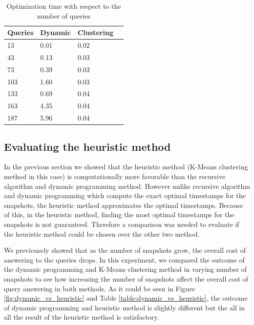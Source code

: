 			\begin {center}
			\begin{table}
				\centering
				\caption{Optimization time with respect to the number of queries}
				\label {table:variable_queries_2}
				\begin{tabular}{p{2cm}p{3cm}p{3cm}p{3cm}}
					\hline
					Queries  & Dynamic  & Clustering \\ \hline
					13 & 0.01  & 0.02  \\  
					43 & 0.13  & 0.03  \\
					73 & 0.39  & 0.03  \\
					103 & 1.60  & 0.03  \\
					133 & 0.69  & 0.04 \\
					163 & 4.35  & 0.04  \\
					187 & 5.96  & 0.04  \\\hline
				\end{tabular}
			\end{table}
			\end{center}

			\subsection{Evaluating the heuristic method} \label{sec:evaluating_heuristic}
			In the previous section we showed that the heuristic method (K-Means clustering method in this case) is computationally more favorable than the recursive algorithm and dynamic programming method. However unlike recursive algorithm and dynamic programming which compute the exact optimal timestamps for the snapshots, the heuristic method approximates the optimal timestamps. Because of this, in the heuristic method, finding the most optimal timestamps for the snapshots is not guaranteed. Therefore a comparison was needed to evaluate if the heuristic method could be chosen over the other two method.

			We previousely showed that as the number of snapshots grow, the overall cost of answering to the queries drops. In this experiment, we compared the outcome of the dynamic programming and K-Means clustering method in varying number of snapshots to see how increasing the number of snapshots affect the overall cost of query answering in both methods. As it could be seen in Figure \ref{fig:dynamic_vs_heuristic} and Table \ref{table:dynamic_vs_heuristic}, the outcome of dynamic programming and heuristic method is slightly different but the all in all the result of the heuristic method is satisfactory.


